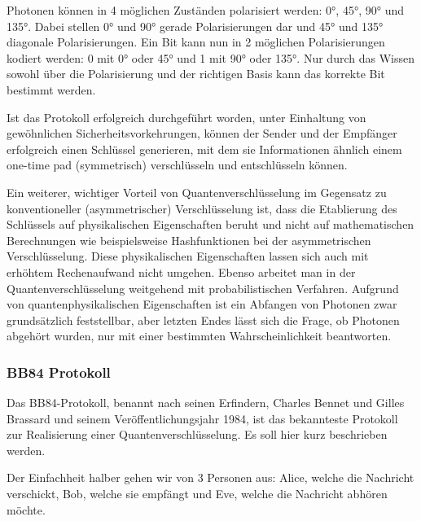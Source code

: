 \documentclass[a4paper,10.2pt,pdftex]{scrartcl}%
\begin{document}
Photonen können in 4 möglichen Zuständen polarisiert werden: 0°, 45°, 90° und 135°. Dabei stellen 0° und 90° gerade Polarisierungen dar und 45° und 135° diagonale Polarisierungen. Ein Bit kann nun in 2 möglichen Polarisierungen kodiert werden: 0 mit 0° oder 45° und 1 mit 90° oder 135°. Nur durch das Wissen sowohl über die Polarisierung und der richtigen Basis kann das korrekte Bit bestimmt werden.

Ist das Protokoll erfolgreich durchgeführt worden, unter Einhaltung von gewöhnlichen Sicherheitsvorkehrungen, können der Sender und der Empfänger erfolgreich einen Schlüssel generieren, mit dem sie Informationen ähnlich einem one-time pad (symmetrisch) verschlüsseln und entschlüsseln können. 

Ein weiterer, wichtiger Vorteil von Quantenverschlüsselung im Gegensatz zu konventioneller (asymmetrischer) Verschlüsselung ist, dass die Etablierung des Schlüssels auf physikalischen Eigenschaften beruht und nicht auf mathematischen Berechnungen wie beispielsweise Hashfunktionen bei der asymmetrischen Verschlüsselung. Diese physikalischen Eigenschaften lassen sich auch mit erhöhtem Rechenaufwand nicht umgehen. Ebenso arbeitet man in der Quantenverschlüsselung weitgehend mit probabilistischen Verfahren. Aufgrund von quantenphysikalischen Eigenschaften ist ein Abfangen von Photonen zwar grundsätzlich feststellbar, aber letzten Endes lässt sich die Frage, ob Photonen abgehört wurden, nur mit einer bestimmten Wahrscheinlichkeit beantworten. 


\subsubsection{BB84 Protokoll}
Das BB84-Protokoll, benannt nach seinen Erfindern, Charles Bennet und Gilles Brassard und seinem Veröffentlichungsjahr 1984, ist das bekannteste Protokoll zur Realisierung einer Quantenverschlüsselung. Es soll hier kurz beschrieben werden.

Der Einfachheit halber gehen wir von 3 Personen aus: Alice, welche die Nachricht verschickt, Bob, welche sie empfängt und Eve, welche die Nachricht abhören möchte.
\end{document}
